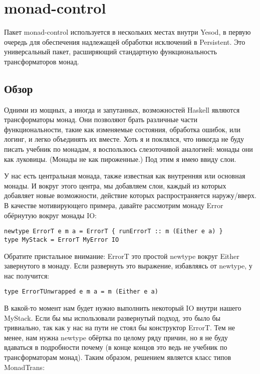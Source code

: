 \chapter{monad-control}\label{chap:monad-control}

Пакет monad-control используется в нескольких местах внутри Yesod, в первую очередь для обеспечения надлежащей обработки исключений в Persistent. Это универсальный пакет, расширяющий стандартную функциональность трансформаторов монад.

\section{Обзор}

Одними из мощных, а иногда и запутанных, возможностей Haskell являются трансформаторы монад. Они позволяют брать различные части функциональности, такие как изменяемые состояния, обработка ошибок, или логинг, и легко объединять их вместе. Хоть я и поклялся, что никогда не буду писать учебник по монадам, я воспользюсь слезоточивой аналогией: монады они как луковицы. (Монады не как пироженные.) Под этим я имею ввиду слои.

У нас есть центральная монада, также известная как внутренняя или основная монады. И вокруг этого центра, мы добавляем слои, каждый из которых добавляет новые возможности, действие которых распространяется наружу/вверх. В качестве мотивирующего примера, давайте рассмотрим монаду Error обёрнутую вокруг монады IO:

\begin{lstlisting}
newtype ErrorT e m a = ErrorT { runErrorT :: m (Either e a) }
type MyStack = ErrorT MyError IO
\end{lstlisting}

Обратите пристальное внимание: ErrorT это простой newtype вокруг Either завернутого в монаду. Если развернуть это выражение, избавляясь от newtype, у нас получится:

\begin{lstlisting}
type ErrorTUnwrapped e m a = m (Either e a)
\end{lstlisting}

В какой-то момент нам будет нужно выполнить некоторый IO внутри нашего MyStack. Если бы мы использовали развернутый подход, это было бы тривиально, так как у нас на пути не стоял бы конструктор ErrorT. Тем не менее, нам нужна newtype обёртка по целому ряду причин, но я не буду вдаваться в подробности почему (в конце концов это ведь не учебник по трансформаторам монад). Таким образом, решением является класс типов MonadTrans:

